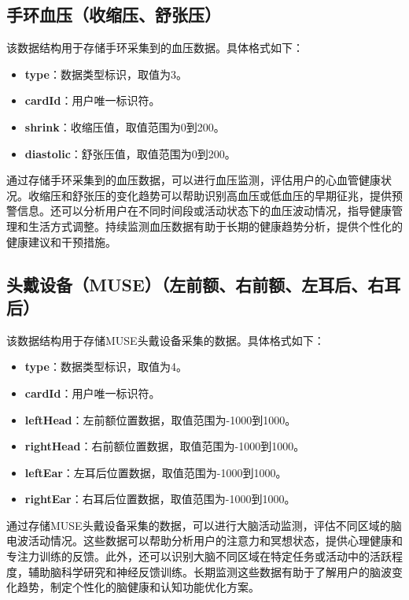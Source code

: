 \documentclass[oneside]{xduugthesis}
\begin{document}
\subsection{手环血压（收缩压、舒张压）}
该数据结构用于存储手环采集到的血压数据。具体格式如下：

\begin{itemize}[nosep]
    \item \textbf{type}：数据类型标识，取值为3。
    \item \textbf{cardId}：用户唯一标识符。
    \item \textbf{shrink}：收缩压值，取值范围为0到200。
    \item \textbf{diastolic}：舒张压值，取值范围为0到200。
\end{itemize}

通过存储手环采集到的血压数据，可以进行血压监测，评估用户的心血管健康状况。收缩压和舒张压的变化趋势可以帮助识别高血压或低血压的早期征兆，提供预警信息。还可以分析用户在不同时间段或活动状态下的血压波动情况，指导健康管理和生活方式调整。持续监测血压数据有助于长期的健康趋势分析，提供个性化的健康建议和干预措施。

\subsection{头戴设备（MUSE）（左前额、右前额、左耳后、右耳后）}
该数据结构用于存储MUSE头戴设备采集的数据。具体格式如下：

\begin{itemize}[nosep]
    \item \textbf{type}：数据类型标识，取值为4。
    \item \textbf{cardId}：用户唯一标识符。
    \item \textbf{leftHead}：左前额位置数据，取值范围为-1000到1000。
    \item \textbf{rightHead}：右前额位置数据，取值范围为-1000到1000。
    \item \textbf{leftEar}：左耳后位置数据，取值范围为-1000到1000。
    \item \textbf{rightEar}：右耳后位置数据，取值范围为-1000到1000。
\end{itemize}

通过存储MUSE头戴设备采集的数据，可以进行大脑活动监测，评估不同区域的脑电波活动情况。这些数据可以帮助分析用户的注意力和冥想状态，提供心理健康和专注力训练的反馈。此外，还可以识别大脑不同区域在特定任务或活动中的活跃程度，辅助脑科学研究和神经反馈训练。长期监测这些数据有助于了解用户的脑波变化趋势，制定个性化的脑健康和认知功能优化方案。
\end{document}
